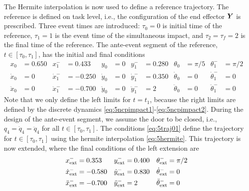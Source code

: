 \documentclass[../DC2019003Bouma.tex]{subfiles}
\begin{document}
The Hermite interpolation is now used to define a reference trajectory. The reference is defined on task level, i.e., the configuration of the end effector ${\boldsymbol{Y}}$ is prescribed. Three event times are introduced: $\tau_0=0$ is initial time of the reference, $\tau_1=1$ is the event time of the simultaneous impact, and $\tau_2 = \tau_f=2$ is the final time of the reference. The ante-event segment of the reference, $t \in [\tau_0,\tau_1]$, has the initial and final conditions
\begin{align}
x_0&= 0.650 &x^-_1&= 0.433 &y_0&= 0 &y^-_1&= 0.280 &\theta_0&= \pi/5 &\theta^-_1&= \pi/2\nonumber\\
\dot{x}_0&= 0 &\dot{x}^-_1&= -0.250 &\dot{y}_0&= 0 &\dot{y}^-_1&= 0.350 &\dot{\theta}_0&= 0 &\dot{\theta}^-_1&= 0\label{eq:5traj01}\\
\ddot{x}_0&= 0 &\ddot{x}^-_1&= -0.700 &\ddot{y}_0&= 0 &\ddot{y}^-_1&= 2 &\ddot{\theta}_0&= 0 &\ddot{\theta}^-_1&= 0\nonumber
\end{align}
Note that we only define the left limits for $t=t_1$, because the right limits are defined by the discrete dynamics \eqref{eq:5ncpimpact1}-\eqref{eq:5ncpimpact2}. During the design of the ante-event segment, we assume the door to be closed, i.e., $q_4=\dot{q}_4=\ddot{q}_4$ for all $t\in[\tau_0,\tau_1]$. The conditions \eqref{eq:5traj01} define the trajectory for $t\in[\tau_0,\tau_1]$ using the hermite interpolation \eqref{eq:5hermite}. This trajectory is now extended, where the final conditions of the left extension are
\begin{align}
x^-_{\textnormal{ext}}&= 0.353 &y^-_{\textnormal{ext}}&= 0.400 &\theta^-_{\textnormal{ext}}&= \pi/2\nonumber\\
\dot{x}^-_{\textnormal{ext}}&= -0.580 &\dot{y}^-_{\textnormal{ext}}&= 0.830 &\dot{\theta}^-_{\textnormal{ext}}&= 0\\
\ddot{x}^-_{\textnormal{ext}}&= -0.700 &\ddot{y}^-_{\textnormal{ext}}&= 2 &\ddot{\theta}^-_{\textnormal{ext}}&= 0\nonumber
\end{align}
\end{document}
